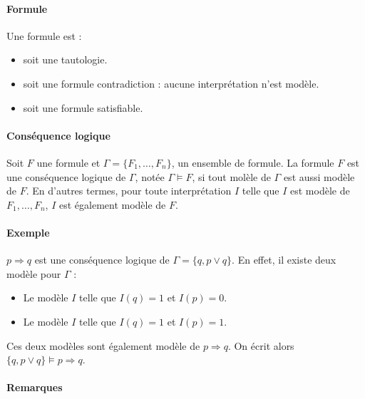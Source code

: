 \documentclass[11pt,twoside,openright,a4paper]{report}
\begin{document}

\paragraph{Formule} %
\label{par:formule}

Une formule est :
\begin{itemize}
	\item soit une tautologie.
	\item soit une formule contradiction : aucune interprétation n'est modèle.
	\item soit une formule satisfiable.
\end{itemize}


\paragraph{Conséquence logique} %
\label{par:cons_quence_logique}

Soit $F$ une formule et $\Gamma = \{F_1,\ldots, F_n\}$, un ensemble de formule. La formule $F$ est une conséquence logique de $\Gamma$, notée $\Gamma \vDash F$, si tout molèle de $\Gamma$ est aussi modèle de $F$. En d'autres termes, pour toute interprétation $I$ telle que $I$ est modèle de $F_1, \ldots, F_n$, $I$ est également modèle de $F$.


\paragraph{Exemple} %
\label{par:exemple}

$p \Rightarrow q$ est une conséquence logique de $\Gamma = \{q, p \lor q\}$. En effet, il existe deux modèle pour $\Gamma$ :
\begin{itemize}
	\item Le modèle $I$ telle que $I(q)=1$ et $I(p)=0$.
	\item Le modèle $I$ telle que $I(q)=1$ et $I(p)=1$.
\end{itemize}

Ces deux modèles sont également modèle de $p \Rightarrow q$. On écrit alors $\{q, p \lor q\} \vDash p \Rightarrow q$.


\paragraph{Remarques} %
\label{par:remarques}
\end{document}
